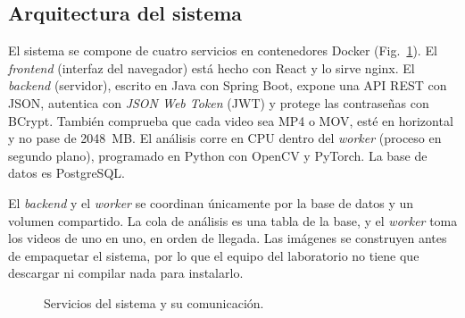 \documentclass[conference,letterpaper]{IEEEtran}
\begin{document}
\subsection{Arquitectura del sistema}

El sistema se compone de cuatro servicios en contenedores Docker (Fig.~\ref{fig:arq}). El
\textit{frontend} (interfaz del navegador) está hecho con React y lo sirve nginx. El
\textit{backend} (servidor), escrito en Java con Spring Boot, expone una API REST con JSON,
autentica con \textit{JSON Web Token} (JWT) y protege las contraseñas con BCrypt. También
comprueba que cada video sea MP4 o MOV, esté en horizontal y no pase de 2048~MB. El
análisis corre en CPU dentro del \textit{worker} (proceso en segundo plano), programado en
Python con OpenCV y PyTorch. La base de datos es PostgreSQL.

El \textit{backend} y el \textit{worker} se coordinan únicamente por la base de datos y un
volumen compartido. La cola de análisis es una tabla de la base, y el \textit{worker} toma
los videos de uno en uno, en orden de llegada. Las imágenes se construyen antes de
empaquetar el sistema, por lo que el equipo del laboratorio no tiene que descargar ni
compilar nada para instalarlo.

\begin{figure}[t]
\centering
{}
\caption{Servicios del sistema y su comunicación.}
\label{fig:arq}
\end{figure}
\end{document}
